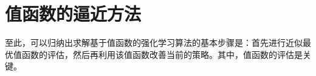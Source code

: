 





\section{值函数的逼近方法}
至此，可以归纳出求解基于值函数的强化学习算法的基本步骤是：首先进行近似最优值函数的评估，然后再利用该值函数改善当前的策略。其中，值函数的评估是关键。

